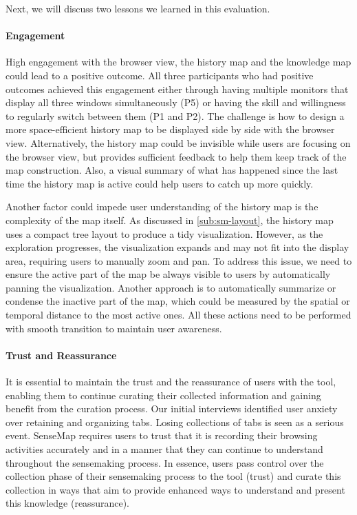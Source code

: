 Next, we will discuss two lessons we learned in this evaluation.

\paragraph{Engagement}
High engagement with the browser view, the history map and the knowledge map could lead to a positive outcome. All three participants who had positive outcomes achieved this engagement either through having multiple monitors that display all three windows simultaneously (P5) or having the skill and willingness to regularly switch between them (P1 and P2). The challenge is how to design a more space-efficient history map to be displayed side by side with the browser view.  Alternatively, the history map could be invisible while users are focusing on the browser view, but provides sufficient feedback to help them keep track of the map construction. Also, a visual summary of what has happened since the last time the history map is active could help users to catch up more quickly.

Another factor could impede user understanding of the history map is the complexity of the map itself.  As discussed in \autoref{sub:sm-layout}, the history map uses a compact tree layout to produce a tidy visualization. However, as the exploration progresses, the visualization expands and may not fit into the display area, requiring users to manually zoom and pan. To address this issue, we need to ensure the active part of the map be always visible to users by automatically panning the visualization. Another approach is to automatically summarize or condense the inactive part of the map, which could be measured by the spatial or temporal distance to the most active ones. All these actions need to be performed with smooth transition to maintain user awareness.

\paragraph{Trust and Reassurance}
It is essential to maintain the trust and the reassurance of users with the tool, enabling them to continue curating their collected information and gaining benefit from the curation process. Our initial interviews identified user anxiety over retaining and organizing tabs. Losing collections of tabs is seen as a serious event. SenseMap requires users to trust that it is recording their browsing activities accurately and in a manner that they can continue to understand throughout the sensemaking process. In essence, users pass control over the collection phase of their sensemaking process to the tool (trust) and curate this collection in ways that aim to provide enhanced ways to understand and present this knowledge (reassurance).

